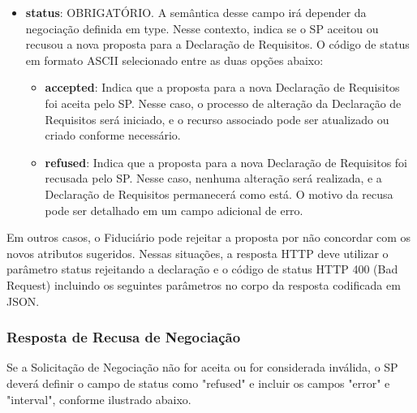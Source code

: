 

\begin{itemize}
    
   \item \textbf{status}: OBRIGATÓRIO. A semântica desse campo irá depender da negociação definida em type. Nesse contexto, indica se o \acs{SP} aceitou ou recusou a nova proposta para a Declaração de Requisitos. O código de status em formato ASCII selecionado entre as duas opções abaixo:

    \begin{itemize}
        \item \textbf{accepted}: Indica que a proposta para a nova Declaração de Requisitos foi aceita pelo \acs{SP}. Nesse caso, o processo de alteração da Declaração de Requisitos será iniciado, e o recurso associado pode ser atualizado ou criado conforme necessário.
        
        \item \textbf{refused}: Indica que a proposta para a nova Declaração de Requisitos foi recusada pelo \acs{SP}. Nesse caso, nenhuma alteração será realizada, e a Declaração de Requisitos permanecerá como está. O motivo da recusa pode ser detalhado em um campo adicional de erro.
    \end{itemize}

\end{itemize}

Em outros casos, o Fiduciário pode rejeitar a proposta por não concordar com os novos atributos sugeridos. Nessas situações, a resposta HTTP deve utilizar o parâmetro status rejeitando a declaração e o código de status HTTP 400 (Bad Request) incluindo os seguintes parâmetros no corpo da resposta codificada em JSON.

\subsubsection*{Resposta de Recusa de Negociação}\label{subsubsection:response-negotiation-error}

Se a Solicitação de Negociação não for aceita ou for considerada inválida, o SP deverá definir o campo de status como "refused" e incluir os campos "error" e "interval", conforme ilustrado abaixo.



